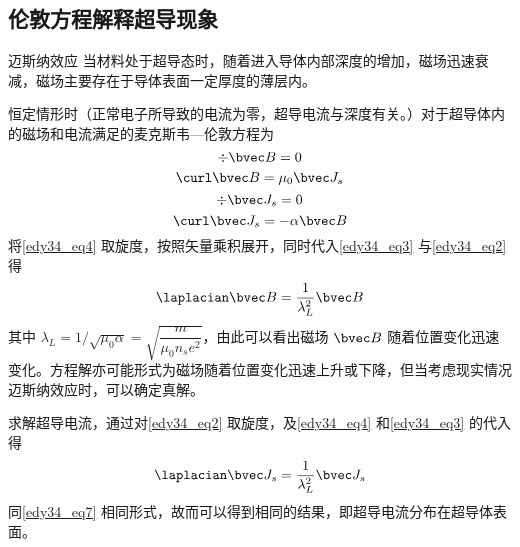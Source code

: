 \subsection{伦敦方程解释超导现象}
\begin{theorem}{迈斯纳效应}
当材料处于超导态时，随着进入导体内部深度的增加，磁场迅速衰减，磁场主要存在于导体表面一定厚度的薄层内。
\end{theorem}
恒定情形时（正常电子所导致的电流为零，超导电流与深度有关。）对于超导体内的磁场和电流满足的麦克斯韦—伦敦方程为
\begin{equation}
\div \bvec B=0\label{edy34_eq3}
\end{equation}
\begin{equation}
\curl \bvec B=\mu_0 \bvec J_s\label{edy34_eq4}
\end{equation}
\begin{equation}
\div \bvec J_s=0\label{edy34_eq5}
\end{equation}
\begin{equation}
\curl \bvec J_s=-\alpha\bvec B
\end{equation}
将\autoref{edy34_eq4} 取旋度，按照矢量乘积展开，同时代入\autoref{edy34_eq3} 与\autoref{edy34_eq2} 得
\begin{equation}
\laplacian \bvec B=\dfrac{1}{\lambda_L^2}\bvec B \label{edy34_eq7}
\end{equation}
其中 $\lambda_L= 1/\sqrt{\mu_0\alpha}=\sqrt{\dfrac m {\mu_0n_se^2}}$，由此可以看出磁场 $\bvec B$ 随着位置变化迅速变化。方程解亦可能形式为磁场随着位置变化迅速上升或下降，但当考虑现实情况迈斯纳效应时，可以确定真解。

求解超导电流，通过对\autoref{edy34_eq2} 取旋度，及\autoref{edy34_eq4} 和\autoref{edy34_eq3} 的代入得
\begin{equation}
\laplacian\bvec J_s=\dfrac 1 {\lambda_L^2}\bvec J_s
\end{equation}
同\autoref{edy34_eq7} 相同形式，故而可以得到相同的结果，即超导电流分布在超导体表面。
